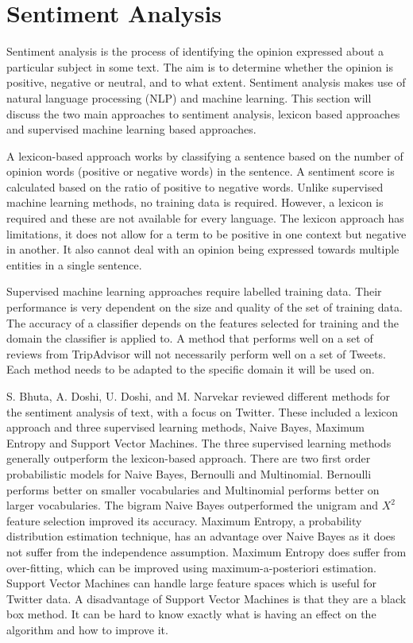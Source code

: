 \section{Sentiment Analysis}

Sentiment analysis is the process of identifying the opinion expressed about a particular subject in some text. The aim is to determine whether the opinion is positive, negative or neutral, and to what extent. Sentiment analysis makes use of natural language processing (NLP) and machine learning. This section will discuss the two main approaches to sentiment analysis, lexicon based approaches and supervised machine learning based approaches. 

A lexicon-based approach works by classifying a sentence based on the number of opinion words (positive or negative words) in the sentence. A sentiment score is calculated based on the ratio of positive to negative words. Unlike supervised machine learning methods, no training data is required. However, a lexicon is required and these are not available for every language. The lexicon approach has limitations, it does not allow for a term to be positive in one context but negative in another. It also cannot deal with an opinion being expressed towards multiple entities in a single sentence.

Supervised machine learning approaches require labelled training data. Their performance is very dependent on the size and quality of the set of training data. The accuracy of a classifier depends on the features selected for training and the domain the classifier is applied to. A method that performs well on a set of reviews from TripAdvisor will not necessarily perform well on a set of Tweets. Each method needs to be adapted to the specific domain it will be used on.

S. Bhuta, A. Doshi, U. Doshi, and M. Narvekar \cite{Bhuta2014} reviewed different methods for the sentiment analysis of text, with a focus on Twitter. These included a lexicon approach and three supervised learning methods, Naive Bayes, Maximum Entropy and Support Vector Machines. The three supervised learning methods generally outperform the lexicon-based approach. There are two first order probabilistic models for Naive Bayes, Bernoulli and Multinomial. Bernoulli performs better on smaller vocabularies and Multinomial performs better on larger vocabularies. The bigram Naive Bayes outperformed the unigram and ${X}^2$ feature selection improved its accuracy. Maximum Entropy, a probability distribution estimation technique, has an advantage over Naive Bayes as it does not suffer from the independence assumption. Maximum Entropy does suffer from over-fitting, which can be improved using maximum-a-posteriori estimation. Support Vector Machines can handle large feature spaces which is useful for Twitter data. A disadvantage of Support Vector Machines is that they are a black box method. It can be hard to know exactly what is having an effect on the algorithm and how to improve it.

